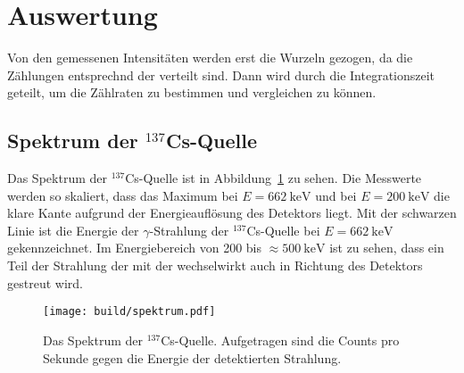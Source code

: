 \section{Auswertung}
\label{sec:Auswertung}
Von den gemessenen Intensitäten werden erst die Wurzeln gezogen, da die Zählungen
entsprechnd der  verteilt sind.
Dann wird durch die Integrationszeit geteilt,
um die Zählraten zu bestimmen und vergleichen zu können.

\subsection{Spektrum der ${}^{137}$Cs-Quelle}
\label{sec:spectrum}
Das Spektrum der ${}^{137}$Cs-Quelle ist in Abbildung~\ref{fig:spektrum} zu sehen.
Die Messwerte werden so skaliert, dass das Maximum bei $E = \SI{662}{\kilo\electronvolt}$
und bei $E = \SI{200}{\kilo\electronvolt}$ die klare Kante
aufgrund der Energieauflösung des Detektors liegt.
Mit der schwarzen Linie ist die Energie der $γ$-Strahlung der ${}^{137}$Cs-Quelle bei
$E = \SI{662}{\kilo\electronvolt}$ gekennzeichnet.
Im Energiebereich von 200 bis $\approx \SI{500}{\kilo\electronvolt}$ ist zu sehen,
dass ein Teil der Strahlung der mit der  wechselwirkt auch in Richtung des Detektors gestreut wird.

\begin{figure}
  \centering
  \texttt{[image: build/spektrum.pdf]}
  \caption{Das Spektrum der ${}^{137}$Cs-Quelle. Aufgetragen sind die Counts pro Sekunde gegen die Energie der detektierten Strahlung.}
  \label{fig:spektrum}
\end{figure}

\newpage

